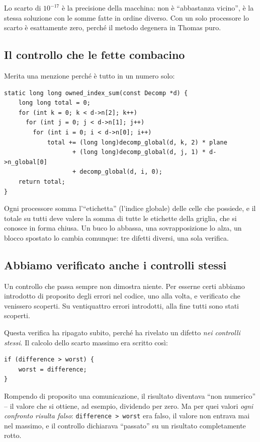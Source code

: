 \documentclass[11pt,a4paper]{article}
\newcommand{\cd}[1]{\texttt{\small #1}}
\begin{document}
\medskip
Lo scarto di $10^{-17}$ è la precisione della macchina: non è ``abbastanza
vicino'', è la stessa soluzione con le somme fatte in ordine diverso. Con un
solo processore lo scarto è esattamente zero, perché il metodo degenera in
Thomas puro.

\subsection*{Il controllo che le fette combacino}

Merita una menzione perché è tutto in un numero solo:

\begin{lstlisting}
static long long owned_index_sum(const Decomp *d) {
    long long total = 0;
    for (int k = 0; k < d->n[2]; k++)
      for (int j = 0; j < d->n[1]; j++)
        for (int i = 0; i < d->n[0]; i++)
            total += (long long)decomp_global(d, k, 2) * plane
                   + (long long)decomp_global(d, j, 1) * d->n_global[0]
                   + decomp_global(d, i, 0);
    return total;
}
\end{lstlisting}

Ogni processore somma l'``etichetta'' (l'indice globale) delle celle che
possiede, e il totale su tutti deve valere la somma di tutte le etichette della
griglia, che si conosce in forma chiusa. Un buco lo abbassa, una sovrapposizione
lo alza, un blocco spostato lo cambia comunque: tre difetti diversi, una sola
verifica.

\subsection*{Abbiamo verificato anche i controlli stessi}

Un controllo che passa sempre non dimostra niente. Per esserne certi abbiamo
introdotto di proposito degli errori nel codice, uno alla volta, e verificato
che venissero scoperti. Su ventiquattro errori introdotti, alla fine tutti sono
stati scoperti.

Questa verifica ha ripagato subito, perché ha rivelato un difetto \emph{nei
controlli stessi}. Il calcolo dello scarto massimo era scritto così:

\begin{lstlisting}
if (difference > worst) {
    worst = difference;
}
\end{lstlisting}

Rompendo di proposito una comunicazione, il risultato diventava ``non
numerico'' -- il valore che si ottiene, ad esempio, dividendo per zero. Ma per
quei valori \emph{ogni confronto risulta falso}: \cd{difference > worst} era
falso, il valore non entrava mai nel massimo, e il controllo dichiarava
``passato'' su un risultato completamente rotto.
\end{document}
